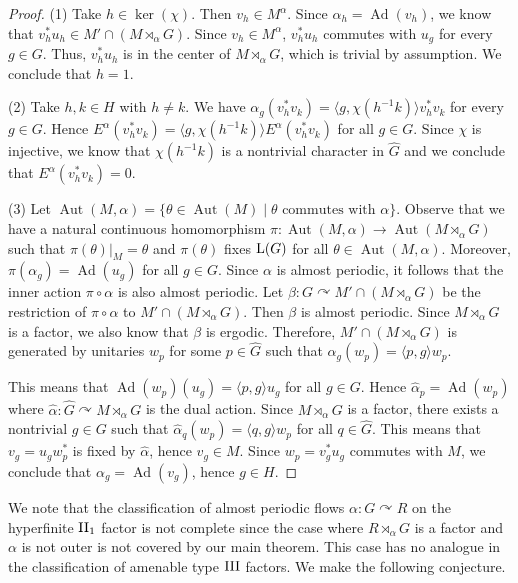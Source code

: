 \documentclass[a4paper,11pt]{amsart}
\numberwithin{equation}{section}
\theoremstyle{definition}
\newcommand{\Ad}{\operatorname{Ad}}
\newcommand{\Aut}{\operatorname{Aut}}
\newcommand{\rL}{\mathord{\text{\rm L}}}
\newcommand{\II}{{\rm II}}
\newcommand{\III}{{\rm III}}
\begin{document}
\begin{proof}
    (1) Take $h \in \ker(\chi)$. Then $v_h \in M^\alpha$. Since $\alpha_h=\Ad(v_h)$, we know that $v_h^*u_h \in M' \cap (M \rtimes_\alpha G)$. Since $v_h \in M^\alpha$, $v_h^*u_h$ commutes with $u_g$ for every $g \in G$. Thus, $v_h^*u_h$ is in the center of $M \rtimes_\alpha G$, which is trivial by assumption. We conclude that $h=1$.

    (2) Take $h,k \in H$ with $h \neq k$. We have $\alpha_g(v_h^*v_k)=\langle g, \chi(h^{-1}k) \rangle v_h^*v_k$ for every $g \in G$. Hence $E^\alpha(v_h^*v_k)=\langle g, \chi(h^{-1}k) \rangle E^\alpha(v_h^*v_k)$ for all $g \in G$. Since $\chi$ is injective, we know that $\chi(h^{-1}k)$ is a nontrivial character in $\widehat{G}$ and we conclude that $E^\alpha(v_h^*v_k)=0$.

    (3) Let $\Aut(M,\alpha)=\{ \theta \in \Aut(M) \mid \theta \text{ commutes with } \alpha \}$. Observe that we have a natural continuous homomorphism $\pi : \Aut(M,\alpha) \rightarrow \Aut(M \rtimes_\alpha G)$ such that $\pi(\theta)|_M=\theta$ and $\pi(\theta)$ fixes $\rL(G)$ for all $\theta \in \Aut(M,\alpha)$. Moreover, $\pi(\alpha_g)=\Ad(u_g)$ for all $g \in G$. Since $\alpha$ is almost periodic, it follows that the inner action $\pi \circ \alpha$ is also almost periodic. Let $\beta : G \curvearrowright M' \cap (M \rtimes_\alpha G)$ be the restriction of $\pi \circ \alpha$ to $M' \cap (M \rtimes_\alpha G)$. Then $\beta$ is almost periodic. Since $M \rtimes_\alpha G$ is a factor, we also know that $\beta$ is ergodic. Therefore, $M' \cap (M \rtimes_\alpha G)$ is generated by unitaries $w_p$ for some $p \in \widehat{G}$ such that $\alpha_g(w_p)=\langle p, g \rangle w_p$.

    This means that $\Ad(w_p)(u_g)=\langle p, g \rangle u_g$ for all $g \in G$. Hence $\widehat{\alpha}_p=\Ad(w_p)$ where $\widehat{\alpha} : \widehat{G} \curvearrowright M \rtimes_\alpha G$ is the dual action. Since $M \rtimes_\alpha G$ is a factor, there exists a nontrivial $g \in G$ such that $\widehat{\alpha}_q(w_p)=\langle q,g \rangle w_p$ for all $q \in \widehat{G}$. This means that $v_g=u_gw_p^*$ is fixed by $\widehat{\alpha}$, hence $v_g \in M$. Since $w_p=v_g^*u_g$ commutes with $M$, we conclude that $\alpha_g=\Ad(v_g)$, hence $g \in H$. 
\end{proof}

We note that the classification of almost periodic flows $\alpha : G \curvearrowright R$ on the hyperfinite $\II_1$ factor is not complete since the case where $R \rtimes_\alpha G$ is a factor and $\alpha$ is not outer is not covered by our main theorem. This case has no analogue in the classification of amenable type $\III$ factors. We make the following conjecture.
\end{document}
